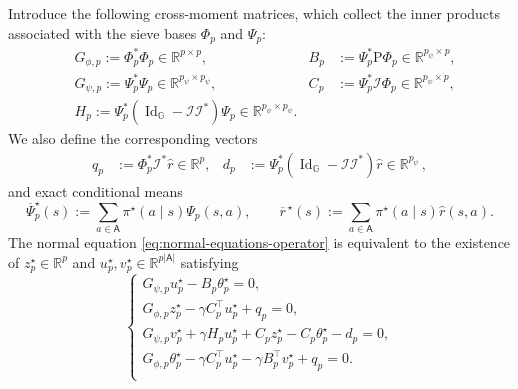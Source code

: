 \documentclass{article}
\theoremstyle{definition}
\theoremstyle{remark}
\theoremstyle{plain}
\newcommand{\MKQ}{\mathrm{P}}
\def\eqsp{\,}
\def\rset{\mathbb{R}}
\newcommand{\dsieve}{p}
\newcommand{\dsievepsi}{p_{\psi}}
\numberwithin{equation}{section}
\begin{document}
Introduce the following cross-moment matrices, which collect the inner products associated with the sieve bases \(\Phi_\dsieve\) and \(\Psi_\dsieve\):
\begin{equation}
\label{eq:population-moments-1}
\begin{aligned}
    &G_{\phi,\dsieve}
    :=
    \Phi_\dsieve^\ast\Phi_\dsieve\in \rset^{\dsieve\times\dsieve},
    \qquad&
    B_\dsieve
    &:=
    \Psi_\dsieve^\ast\MKQ\Phi_\dsieve\in \rset^{\dsievepsi\times\dsieve},
    \\
    &G_{\psi,\dsieve}
    :=
\Psi_\dsieve^\ast\Psi_\dsieve\in \rset^{\dsievepsi\times\dsievepsi},
    &
    C_\dsieve
    &:=
    \Psi_\dsieve^\ast\mathcal I\Phi_\dsieve\in \rset^{\dsievepsi\times\dsieve},\\
    &H_\dsieve
    :=
    \Psi_\dsieve^\ast
    (\operatorname{Id}_{\mathbb G}-\mathcal I\mathcal I^\ast)
    \Psi_\dsieve\in \rset^{\dsievepsi\times\dsievepsi}.
\end{aligned}
\end{equation}
We also define the corresponding vectors
\begin{align}
\label{eq:population-moments-2}
    q_\dsieve
    &:=
    \Phi_\dsieve^\ast\mathcal I^\ast\widehat r\in \rset^\dsieve,
    &
    d_\dsieve
    &:=
    \Psi_\dsieve^\ast
    (\operatorname{Id}_{\mathbb G}-\mathcal I\mathcal I^\ast)
    \widehat r\in\rset^{\dsievepsi}\eqsp,
\end{align}
and exact conditional means
\begin{equation}
\label{eq:exact-centers}
    \overline\Psi_\dsieve^\star(s)
    :=
    \sum_{a\in\mathsf A}
    \pi^\star(a\mid s)\Psi_\dsieve(s,a),
    \qquad
    \overline{r}^{\,\star}(s)
    :=
    \sum_{a\in\mathsf A}
    \pi^\star(a\mid s)\widehat r(s,a).
\end{equation}
The normal equation \eqref{eq:normal-equations-operator} is equivalent to the existence of  \(z^\star_\dsieve\in\rset^{\dsieve}\) and  \(u_\dsieve^\star, v^\star_\dsieve\in\rset ^{\dsieve|\mathsf{A}|}\) satisfying
\begin{equation}
\label{eq:coupled-system}
\begin{cases}
    G_{\psi,\dsieve}u_\dsieve^\star-B_\dsieve\theta_\dsieve^\star
    =0,
    \\[0.3em]
    G_{\phi,\dsieve}z_\dsieve^\star
    -
    \gamma C_\dsieve^\top u_\dsieve^\star
    +
    q_\dsieve
    =0,
    \\[0.3em]


    G_{\psi,\dsieve}v_\dsieve^\star
    +
    \gamma H_\dsieve u_\dsieve^\star
    +
    C_\dsieve z_\dsieve^\star
    -
    C_\dsieve \theta_\dsieve^\star
    -
    d_\dsieve
    =0,
    \\[0.3em]
    G_{\phi,\dsieve}\theta_\dsieve^\star
    -
    \gamma C_\dsieve^\top u_\dsieve^\star
    -
    \gamma B_\dsieve^\top v_\dsieve^\star
    +
    q_\dsieve
    =0.
    \\[0.3em]

\end{cases}
\end{equation}
\end{document}

